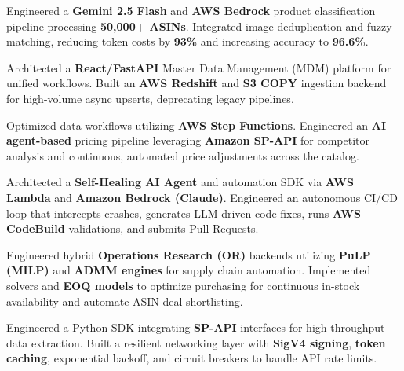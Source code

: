 \documentclass[letterpaper,10pt]{article}
\begin{document}
\begin{resume_list}
    \item{Engineered a \textbf{Gemini 2.5 Flash} and \textbf{AWS Bedrock} product classification pipeline processing \textbf{50,000+ ASINs}. Integrated image deduplication and fuzzy-matching, reducing token costs by \textbf{93\%} and increasing accuracy to \textbf{96.6\%}.}
    \item{Architected a \textbf{React/FastAPI} Master Data Management (MDM) platform for unified workflows. Built an \textbf{AWS Redshift} and \textbf{S3 COPY} ingestion backend for high-volume async upserts, deprecating legacy pipelines.}
    \item{Optimized data workflows utilizing \textbf{AWS Step Functions}. Engineered an \textbf{AI agent-based} pricing pipeline leveraging \textbf{Amazon SP-API} for competitor analysis and continuous, automated price adjustments across the catalog.}
    \item{Architected a \textbf{Self-Healing AI Agent} and automation SDK via \textbf{AWS Lambda} and \textbf{Amazon Bedrock (Claude)}. Engineered an autonomous CI/CD loop that intercepts crashes, generates LLM-driven code fixes, runs \textbf{AWS CodeBuild} validations, and submits Pull Requests.}
    \item{Engineered hybrid \textbf{Operations Research (OR)} backends utilizing \textbf{PuLP (MILP)} and \textbf{ADMM engines} for supply chain automation. Implemented solvers and \textbf{EOQ models} to optimize purchasing for continuous in-stock availability and automate ASIN deal shortlisting.}
    \item{Engineered a Python SDK integrating \textbf{SP-API} interfaces for high-throughput data extraction. Built a resilient networking layer with \textbf{SigV4 signing}, \textbf{token caching}, exponential backoff, and circuit breakers to handle API rate limits.}
\end{resume_list}
\end{document}
